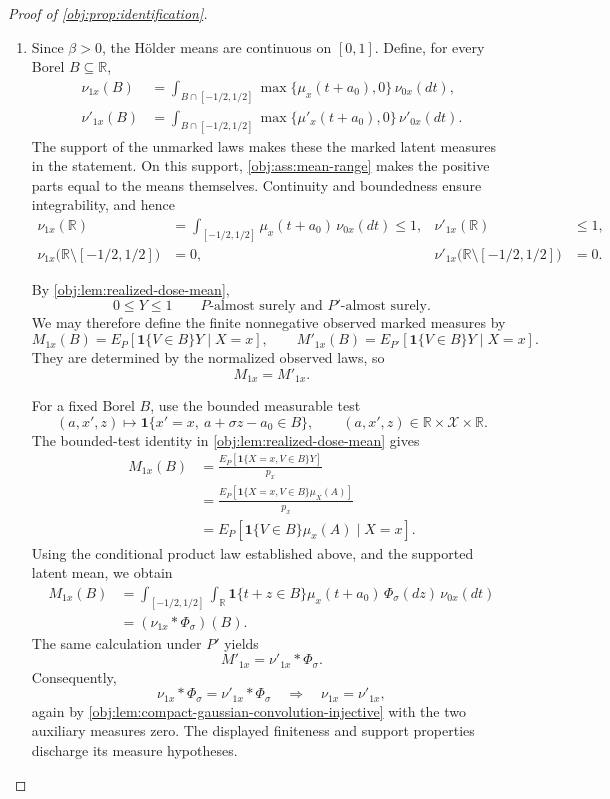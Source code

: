 \documentclass[11pt]{article}
\begin{document}
\begin{proof}[Proof of \cref{obj:prop:identification}]
\begin{enumerate}
\item Since \(\beta>0\), the Hölder means are continuous on \([0,1]\). Define, for every Borel \(B\subseteq\mathbb R\),
\[
\begin{aligned}
\nu_{1x}(B)
&=\int_{B\cap[-1/2,1/2]}
\max\{\mu_x(t+a_0),0\}\,\nu_{0x}(dt),\\
\nu'_{1x}(B)
&=\int_{B\cap[-1/2,1/2]}
\max\{\mu'_x(t+a_0),0\}\,\nu'_{0x}(dt).
\end{aligned}
\]
The support of the unmarked laws makes these the marked latent measures in the statement. On this support, \cref{obj:ass:mean-range} makes the positive parts equal to the means themselves. Continuity and boundedness ensure integrability, and hence
\[
\begin{aligned}
\nu_{1x}(\mathbb R)
&=\int_{[-1/2,1/2]}\mu_x(t+a_0)\,\nu_{0x}(dt)\le1,
&
\nu'_{1x}(\mathbb R)&\le1,\\
\nu_{1x}\bigl(\mathbb R\setminus[-1/2,1/2]\bigr)
&=0,
&
\nu'_{1x}\bigl(\mathbb R\setminus[-1/2,1/2]\bigr)&=0.
\end{aligned}
\]

By \cref{obj:lem:realized-dose-mean},
\[
0\le Y\le1
\qquad P\text{-almost surely and }P'\text{-almost surely}.
\]
We may therefore define the finite nonnegative observed marked measures by
\[
M_{1x}(B)=E_P[\mathbf1\{V\in B\}Y\mid X=x],
\qquad
M'_{1x}(B)=E_{P'}[\mathbf1\{V\in B\}Y\mid X=x].
\]
They are determined by the normalized observed laws, so
\[
M_{1x}=M'_{1x}.
\]

For a fixed Borel \(B\), use the bounded measurable test
\[
(a,x',z)\longmapsto
\mathbf1\{x'=x,\ a+\sigma z-a_0\in B\},
\qquad
(a,x',z)\in\mathbb R\times\mathcal X\times\mathbb R.
\]
The bounded-test identity in \cref{obj:lem:realized-dose-mean} gives
\[
\begin{aligned}
M_{1x}(B)
&=\frac{E_P[\mathbf1\{X=x,V\in B\}Y]}{p_x}\\
&=\frac{E_P[\mathbf1\{X=x,V\in B\}\mu_X(A)]}{p_x}\\
&=E_P[\mathbf1\{V\in B\}\mu_x(A)\mid X=x].
\end{aligned}
\]
Using the conditional product law established above, and the supported latent mean, we obtain
\[
\begin{aligned}
M_{1x}(B)
&=\int_{[-1/2,1/2]}\int_{\mathbb R}
\mathbf1\{t+z\in B\}\mu_x(t+a_0)\,
\Phi_\sigma(dz)\,\nu_{0x}(dt)\\
&=(\nu_{1x}*\Phi_\sigma)(B).
\end{aligned}
\]
The same calculation under \(P'\) yields
\[
M'_{1x}=\nu'_{1x}*\Phi_\sigma.
\]
Consequently,
\[
\nu_{1x}*\Phi_\sigma=\nu'_{1x}*\Phi_\sigma
\quad\Longrightarrow\quad
\nu_{1x}=\nu'_{1x},
\]
again by \cref{obj:lem:compact-gaussian-convolution-injective} with the two auxiliary measures zero. The displayed finiteness and support properties discharge its measure hypotheses.


\end{enumerate}
\end{proof}
\end{document}
